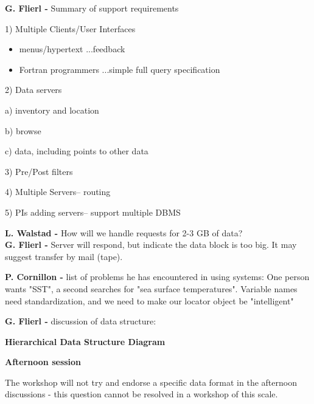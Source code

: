 {\bf G. Flierl -} Summary of support requirements
\begin{description}
	\item{1)} Multiple Clients/User Interfaces
	   \begin{itemize}
		\item menus/hypertext \quad\quad        ...feedback
		\item Fortran programmers \quad\quad ...simple full query
specification
	   \end{itemize}

	\item {2)} Data servers
	   \begin{description}
		\item{a)} inventory and location
		\item{b)} browse
		\item{c)} data, including points to other data 
	   \end{description}
	\item{3)} Pre/Post filters

	\item{4)} Multiple Servers-- routing

	\item{5)} PIs adding servers-- 	support multiple DBMS
\end{description}
\smallskip
{\bf L. Walstad -} How will we handle requests for 2-3 GB of data?\\
{\bf G. Flierl -} Server will respond, but indicate the data block is too
big.  It may suggest transfer by mail (tape).  

\smallskip
{\bf P. Cornillon -} list of problems he has encountered in using systems:
One person wants "SST",  a second searches for "sea surface 
temperatures".  Variable names need standardization, and we need to make 
our locator object be "intelligent"


{\bf G. Flierl -} discussion of data structure:

\begin{center}
{\bf Hierarchical Data Structure Diagram} 
\end{center}
\medskip

\Large
\begin{center}
{\bf Afternoon session}
\end{center}
\normalsize

The workshop will not try and endorse a specific data format in the 
afternoon discussions - this question cannot be resolved in a workshop of 
this scale.  

